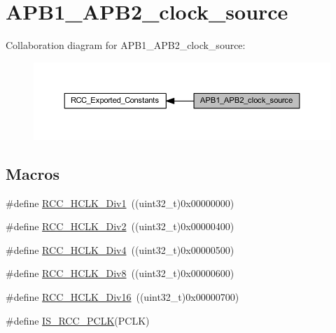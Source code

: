 \hypertarget{group___a_p_b1___a_p_b2__clock__source}{}\section{A\+P\+B1\+\_\+\+A\+P\+B2\+\_\+clock\+\_\+source}
\label{group___a_p_b1___a_p_b2__clock__source}
Collaboration diagram for A\+P\+B1\+\_\+\+A\+P\+B2\+\_\+clock\+\_\+source\+:
\nopagebreak
\begin{figure}[H]
\begin{center}
\leavevmode
\includegraphics[width=350pt]{group___a_p_b1___a_p_b2__clock__source}
\end{center}
\end{figure}
\subsection*{Macros}
\begin{DoxyCompactItemize}
\item 
\#define \hyperlink{group___a_p_b1___a_p_b2__clock__source_gae62b4a39ae69cc221f2ab7d4518bfb76}{R\+C\+C\+\_\+\+H\+C\+L\+K\+\_\+\+Div1}~((uint32\+\_\+t)0x00000000)
\item 
\#define \hyperlink{group___a_p_b1___a_p_b2__clock__source_ga177bb3648def9a961c16f93f15ca0f62}{R\+C\+C\+\_\+\+H\+C\+L\+K\+\_\+\+Div2}~((uint32\+\_\+t)0x00000400)
\item 
\#define \hyperlink{group___a_p_b1___a_p_b2__clock__source_gafd8cf0e32a3ea5648cdc054766bc2017}{R\+C\+C\+\_\+\+H\+C\+L\+K\+\_\+\+Div4}~((uint32\+\_\+t)0x00000500)
\item 
\#define \hyperlink{group___a_p_b1___a_p_b2__clock__source_gab2e2b6e0b8fe22d6638b672918b22097}{R\+C\+C\+\_\+\+H\+C\+L\+K\+\_\+\+Div8}~((uint32\+\_\+t)0x00000600)
\item 
\#define \hyperlink{group___a_p_b1___a_p_b2__clock__source_ga6353aaa0b302fdd5d946fd21756e2273}{R\+C\+C\+\_\+\+H\+C\+L\+K\+\_\+\+Div16}~((uint32\+\_\+t)0x00000700)
\item 
\#define \hyperlink{group___a_p_b1___a_p_b2__clock__source_gab70f1257ea47c1da4def8e351af4d9f2}{I\+S\+\_\+\+R\+C\+C\+\_\+\+P\+C\+LK}(P\+C\+LK)
\end{DoxyCompactItemize}


